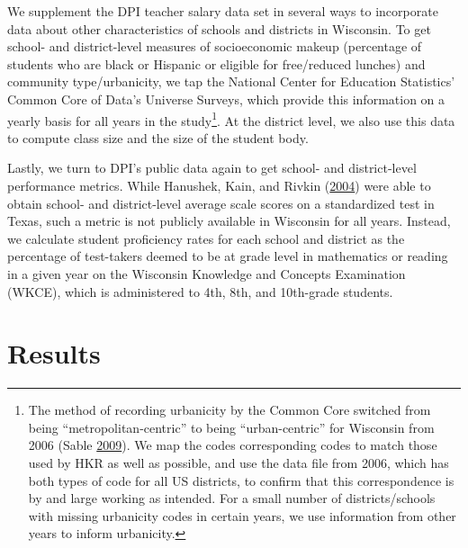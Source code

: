 \documentclass[]{article}
\let\rmarkdownfootnote\footnote%
\def\footnote{\protect\rmarkdownfootnote}
\begin{document}
We supplement the DPI teacher salary data set in several ways to
incorporate data about other characteristics of schools and districts in
Wisconsin. To get school- and district-level measures of socioeconomic
makeup (percentage of students who are black or Hispanic or eligible for
free/reduced lunches) and community type/urbanicity, we tap the National
Center for Education Statistics' Common Core of Data's Universe Surveys,
which provide this information on a yearly basis for all years in the
study\footnote{The method of recording urbanicity by the Common Core
  switched from being ``metropolitan-centric'' to being
  ``urban-centric'' for Wisconsin from 2006 (Sable
  \protect\hyperlink{ref-sable}{2009}). We map the codes corresponding
  codes to match those used by HKR as well as possible, and use the data
  file from 2006, which has both types of code for all US districts, to
  confirm that this correspondence is by and large working as intended.
  For a small number of districts/schools with missing urbanicity codes
  in certain years, we use information from other years to inform
  urbanicity.}. At the district level, we also use this data to compute
class size and the size of the student body.

Lastly, we turn to DPI's public data again to get school- and
district-level performance metrics. While Hanushek, Kain, and Rivkin
(\protect\hyperlink{ref-hanushek}{2004}) were able to obtain school- and
district-level average scale scores on a standardized test in Texas,
such a metric is not publicly available in Wisconsin for all years.
Instead, we calculate student proficiency rates for each school and
district as the percentage of test-takers deemed to be at grade level in
mathematics or reading in a given year on the Wisconsin Knowledge and
Concepts Examination (WKCE), which is administered to 4th, 8th, and
10th-grade students.

\section{Results}\label{results}
\end{document}
